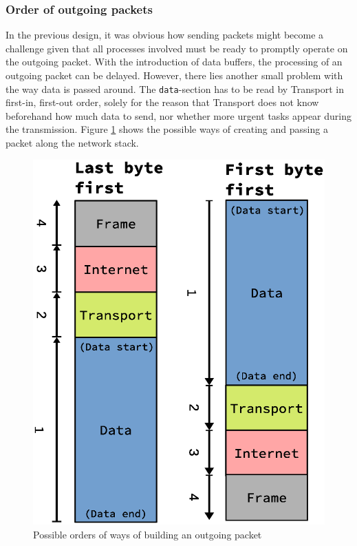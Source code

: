\subsubsection{Order of outgoing packets}
In the previous design, it was obvious how sending packets might become a challenge
given that all processes involved must be ready to promptly operate on the
outgoing packet. With the introduction of data buffers, the processing of an
outgoing packet can be delayed.
However, there lies another small problem with the way data is passed around.
The \texttt{data}-section has to be read by Transport in first-in, first-out
order, solely for the reason that Transport does not know beforehand how much
data to send, nor whether more urgent tasks appear during the transmission.
Figure \ref{fig:sending_packet_order} shows the possible ways of creating and
passing a packet along the network stack.
\begin{figure}
    \centering
    \includegraphics[scale=0.45]{design/sending_packet_order.eps}
    \caption{Possible orders of ways of building an outgoing packet}
    \label{fig:sending_packet_order}
\end{figure}
